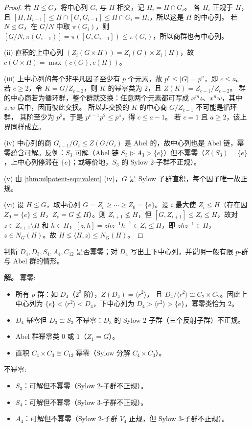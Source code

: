 \begin{proof}
若 $H\le G$，将中心列 $G_i$ 与 $H$ 相交，记 $H_i=H\cap G_i$。
各 $H_i$ 正规于 $H$，且
$[H,H_{i-1}]\le H\cap[G,G_{i-1}]\le H\cap G_i=H_i$，所以这是 $H$ 的中心列。
若 $N\mathrel{\trianglelefteq}G$，在 $G/N$ 中取 $\pi(G_i)$，则
$[G/N,\pi(G_{i-1})]=\pi([G,G_{i-1}])\le\pi(G_i)$，所以商群也有中心列。

(ii) 直积的上中心列 $(Z_i(G\times H))=Z_i(G)\times Z_i(H)$，故 $c(G\times H)=\max(c(G),c(H))$。

(iii) 上中心列的每个非平凡因子至少有 $p$ 个元素，故
$p^c\le |G|=p^a$，即 $c\le a$。
若 $c\ge2$，令 $K=G/Z_{c-2}$，则 $K$ 的幂零类为 $2$，且
$Z(K)=Z_{c-1}/Z_{c-2}$。
群的中心商若为循环群，整个群就交换：任意两个元素都可写成
$x^m z$、$x^n w$，其中 $z,w$ 居中，因而彼此交换。
所以非交换的 $K$ 的中心商 $G/Z_{c-1}$ 不可能是循环群，
其阶至少为 $p^2$。于是 $p^{c-1}p^2\le p^a$，得 $c\le a-1$。
若 $c=1$ 且 $a\ge2$，该上界同样成立。

(iv) 中心列的商 $G_{i-1}/G_i\le Z(G/G_i)$ 是 Abel 的，故中心列也是 Abel 链，幂零蕴含可解。反例：$S_3$ 可解（Abel 链 $S_3\rhd A_3\rhd\{e\}$）但不幂零（$Z(S_3)=\{e\}$，上中心列停滞在 $\{e\}$；或等价地，$S_3$ 的 Sylow $2$-子群不正规）。

(v) 由 \cref{thm:nilpotent-equivalent} (iv)，$G$ 是 Sylow 子群直积，每个因子唯一故正规。

(vi) 设 $H\lneq G$，取中心列 $G=Z_c\ge\cdots\ge Z_0=\{e\}$。设 $i$ 最大使 $Z_i\le H$（存在因 $Z_0=\{e\}\le H$，$Z_c=G\nleq H$）。则 $Z_{i+1}\nleq H$，但 $[G,Z_{i+1}]\le Z_i\le H$，故对 $z\in Z_{i+1}\setminus H$ 和 $h\in H$，$[z,h]=zhz^{-1}h^{-1}\in Z_i\le H$，即 $zhz^{-1}\in H$，$z\in N_G(H)$。故 $H\lneq\langle H,z\rangle\le N_G(H)$。
\end{proof}

\begin{example}[{幂零群的实例与非实例}]
判断 $D_4,D_3,S_4,A_4,C_{12}$ 是否幂零；对 $D_4$ 写出上下中心列，并说明一般有限 $p$-群与 Abel 群的情形。

\textbf{解。} 幂零:
\begin{itemize}
\item 所有 $p$-群：如 $D_4$（$2^3$ 阶），$Z(D_4)=\langle r^2\rangle$，
且 $D_4/\langle r^2\rangle\cong C_2\times C_2$。因此上中心列为
$\{e\}<\langle r^2\rangle<D_4$，下中心列为
$D_4>\langle r^2\rangle>\{e\}$，幂零类恰为 $2$。
\item $D_4$ 幂零但 $D_3\cong S_3$ 不幂零：$D_3$ 的 Sylow $2$-子群（三个反射子群）不正规。
\item Abel 群幂零类 $0$ 或 $1$（$Z_1=G$）。
\item 直积 $C_4\times C_3\cong C_{12}$ 幂零（Sylow 分解 $C_4\times C_3$）。
\end{itemize}
不幂零:
\begin{itemize}
\item $S_3$：可解但不幂零（Sylow $2$-子群不正规）。
\item $S_4$：可解但不幂零（Sylow $3$-子群不正规）。
\item $A_4$：可解但不幂零（Sylow $2$-子群 $V_4$ 正规，但 Sylow $3$-子群不正规）。
\end{itemize}
\end{example}


